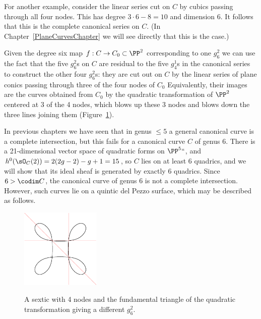 For another example, consider the linear series cut on $C$ by cubics
passing through all four nodes. This has degree $3\cdot 6 - 8 = 10$
and dimension 6. It follows that this is the
complete canonical series
on $C$. (In Chapter~\ref{PlaneCurvesChapter} we will see directly that
this is the case.)

Given the degree six map $f : C \to C_0 \subset \PP^2$ corresponding
to one $g^2_6$ we can use the fact that the five $g^2_6$s on $C$ are
residual to the five $g^1_4$s in the canonical series to construct the
other four $g^2_6$s: they are cut out on $C$ by the linear series of plane
conics passing through three of the four nodes of $C_0$  Equivalently,
their images are the curves obtained from $C_{0}$ by the quadratic
transformation
of $\PP^{2}$ centered at 3 of the 4 nodes, which blows up these 3 nodes
and blows down the three lines
 joining them (Figure~\ref{plane sextics 3}).

 In previous chapters we have seen that in genus $\leq 5$ a general
 canonical curve is  a complete intersection, but this fails for a
%
 canonical curve
%
$C$ of genus 6. There is a 21-dimensional vector space of
quadratic forms on $\PP^5` `$, and $h^0(\sO_C(2)) = 2(2g-2)-g+1 = 15$,
so $C$ lies on at least 6 quadrics, and we will show that its ideal sheaf
is generated by exactly 6 quadrics. Since $6>\codim C$, the canonical
curve of genus 6 is not a complete intersection. However, such curves
lie on a quintic del Pezzo surface, which may be described as follows.
%


\begin{figure}
\centerline {\includegraphics[height=1.5in,trim=10 10 10 10,clip]{main/Fig11-4-new}}
\caption{A sextic with 4 nodes and the fundamental triangle of the
quadratic transformation giving
a different $g^{2}_{6}$.}
%
\label{plane sextics 3}
\end{figure}



